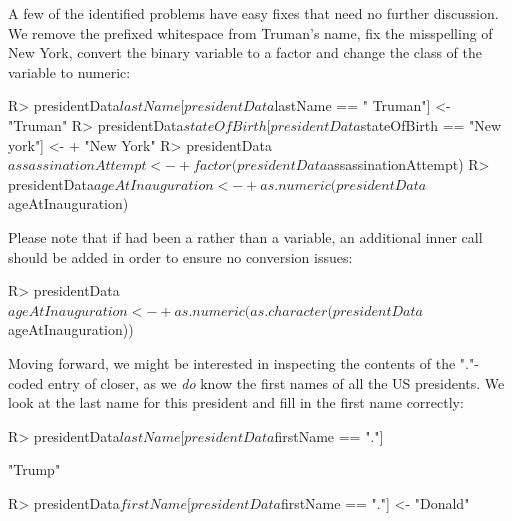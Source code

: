 \documentclass[article,shortnames]{jss}
\begin{document}
A few of the identified problems have easy fixes that need no further discussion. We remove the prefixed whitespace from Truman's name, fix the misspelling of New York, convert the binary variable  to a factor and change the class of the  variable to numeric:

\begin{Schunk}
\begin{Sinput}
R> presidentData$lastName[presidentData$lastName == " Truman"] <- "Truman"
R> presidentData$stateOfBirth[presidentData$stateOfBirth == "New york"] <- 
+    "New York"
R> presidentData$assassinationAttempt <- 
+    factor(presidentData$assassinationAttempt)
R> presidentData$ageAtInauguration <- 
+    as.numeric(presidentData$ageAtInauguration)
\end{Sinput}
\end{Schunk}

Please note that if  had been a  rather than a  variable, an additional inner call should be added in order to ensure no conversion issues:

\begin{Schunk}
\begin{Sinput}
R> presidentData$ageAtInauguration <- 
+    as.numeric(as.character(presidentData$ageAtInauguration))
\end{Sinput}
\end{Schunk}

Moving forward, we might be interested in inspecting the contents of the "."-coded entry of  closer, as we \textit{do} know the first names of all the US presidents. We look at the last name for this president and fill in the first name correctly:

\begin{Schunk}
\begin{Sinput}
R> presidentData$lastName[presidentData$firstName == "."]
\end{Sinput}
\begin{Soutput}
[1] "Trump"
\end{Soutput}
\end{Schunk}

\begin{Schunk}
\begin{Sinput}
R> presidentData$firstName[presidentData$firstName == "."] <- "Donald"
\end{Sinput}
\end{Schunk}
\end{document}
